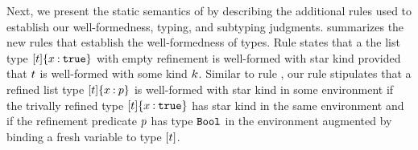          
%
Next, we present the static semantics of \sysrfd by describing
the additional rules used to establish our
well-formedness, typing, and subtyping judgments.
%
 summarizes the new rules
that establish the well-formedness of types.
%
Rule \wtList states that a the list type 
${{[t]}\{x \mathbin{:} \mathtt{true}\}}$
with empty refinement
is well-formed with star kind provided that 
$t$ is well-formed with some kind $k$.
%
Similar to rule \wtRefn, our rule \wtListR 
stipulates that a refined list type ${{[t]}\{x \mathbin{:} p\}}$
is well-formed with star kind in some environment
if the trivally refined type ${{[t]}\{x \mathbin{:} \mathtt{true}\}}$
has star kind in the same environment and if
the refinement predicate $p$ has type $\texttt{Bool}$
in the environment augmented by binding a fresh variable to type $[t]$.

